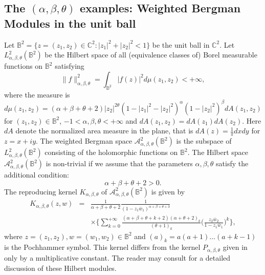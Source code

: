 \documentclass[11pt]{amsart}
\theoremstyle{definition}
\numberwithin{equation}{section}
\begin{document}
\subsection{\sf  The $(\alpha, \beta, \theta)$ examples: Weighted Bergman Modules in the unit ball}
Let $\mathbb B^2 = \{z = (z_1,z_2)\in{{\mathbb C}}^2: |z_1|^2+|z_2|^2<1\}$ be the unit ball in ${{\mathbb C}}^2$. Let $L^2_{\alpha,\beta,\theta}(\mathbb B^2)$ be the Hilbert space of all (equivalence classes of) Borel measurable functions on $\mathbb B^2$ satisfying 
$$
\parallel f\parallel^2_{\alpha,\beta,\theta} = \int_{\mathbb B^2} |f(z)|^2d\mu(z_1,z_2)<+\infty,
$$
where the measure is 
$$
d\mu(z_1,z_2) = (\alpha+\beta+\theta+2)|z_2|^{2\theta}(1 - |z_1|^2 - |z_2|^2)^{\alpha}(1 - |z_2|^2)^{\beta}dA(z_1,z_2)
$$
for $(z_1,z_2)\in\mathbb B^2$, $-1<\alpha,\beta,\theta<+\infty$ and $dA(z_1,z_2) = dA(z_1)dA(z_2)$. Here $dA$ denote the normalized area measure in the plane, that is $dA(z) = \frac{1}{\pi} dxdy$ for $z=x+iy$. The weighted Bergman space $\mathcal A^2_{\alpha,\beta,\theta}(\mathbb B^2)$ is the subspace of $L^2_{\alpha,\beta,\theta}(\mathbb B^2)$ consisting of the holomorphic functions on $\mathbb B^2$. The Hilbert space $\mathcal A^2_{\alpha,\beta,\theta}(\mathbb B^2)$ is non-trivial if we assume that the parameters $\alpha,\beta,\theta$ satisfy the additional condition:
$$
\alpha+\beta+\theta +2>0.
$$
The reproducing kernel $K_{\alpha,\beta,\theta}$ of $\mathcal A^2_{\alpha,\beta,\theta}(\mathbb B^2)$ is given by
\begin{eqnarray*}
K_{\alpha,\beta,\theta}(z,w) &=& \frac{1}{\alpha+\beta+\theta +2}\frac{1}{(1- z_1\bar w_1)^{\alpha+\beta+\theta+3}}\\ &&\times\bigg\{\sum_{k=0}^{+\infty}\frac{(\alpha+\beta+\theta+k+2)(\alpha+\theta+2)_k}{(\theta+1)_k}\bigg(\frac{z_2\bar w_2}{1- z_1\bar w_1}\bigg)^k\bigg\}, 
\end{eqnarray*}
where $z=(z_1,z_2), w=(w_1,w_2)\in\mathbb B^2$ and $(a)_k= a(a+1)\ldots(a+k-1)$ is the Pochhammer symbol. This kernel differs from the kernel $P_{\alpha,\beta,\theta}$ given in \cite{hss} only by a multiplicative constant. The reader may consult \cite{hss} for a detailed discussion of these Hilbert modules. 
 
\end{document}
